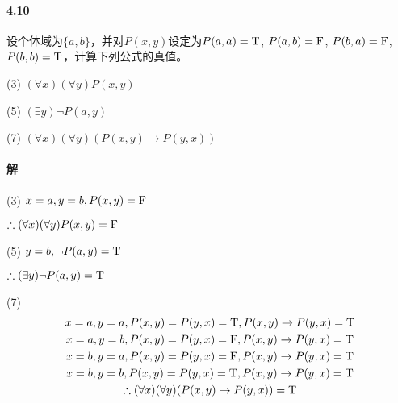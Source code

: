 \documentclass[hyperref, UTF8]{ctexart}
\newcommand{\true}{{\rm T}}
\newcommand{\false}{{\rm F}}
\begin{document}
\paragraph{4.10}\label{4.10}
设个体域为$ \{ a,b \} $，并对$P(x,y)$设定为$P(a,a)=\true$, $P(a,b)=\false$, $P(b,a)=\false$, $P(b,b)=\true$，计算下列公式的真值。

(3) $  ( \forall x) ( \forall y)P(x,y) $ 

(5) $  ( \exists y) \lnot P(a,y) $ 

(7) $  ( \forall x) ( \forall y)(P(x,y) \rightarrow P(y,x)) $

\paragraph{解}
(3) $x=a, y=b, P(x,y)=\false$

$ \therefore (\forall x)(\forall y)P(x,y)=\false$

(5) $ y=b, \lnot P(a,y)=\true $

$\therefore (\exists y)\lnot P(a,y)=\true $

(7) 
\begin{gather*}
x=a, y=a, P(x,y)=P(y,x)= \true , P(x,y) \rightarrow P(y,x)= \true \\
x=a, y=b, P(x,y)=P(y,x)= \false , P(x,y) \rightarrow P(y,x)= \true \\
x=b, y=a, P(x,y)=P(y,x)= \false , P(x,y) \rightarrow P(y,x)= \true \\
x=b, y=b, P(x,y)=P(y,x)= \true , P(x,y) \rightarrow P(y,x)= \true \\
\therefore ( \forall x) ( \forall y)(P(x,y) \rightarrow P(y,x))= \true
\end{gather*}
\end{document}
